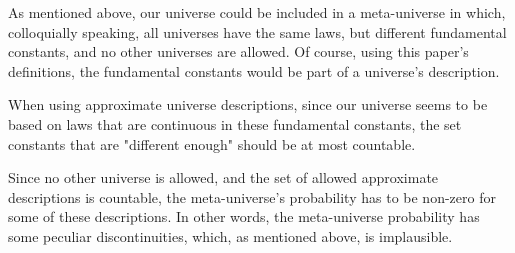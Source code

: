 \documentclass[a4paper
,draft
]{article}
\def\reale{\mathbb{R}}
\newcommand{\ghilimele}[1]{``#1"}
\begin{document}
As mentioned above, our universe could be included in a meta-universe in which,
colloquially speaking, all universes have the same laws,
but different fundamental constants, and no other universes are allowed.
Of course, using this paper's definitions,
the fundamental constants would be part of a universe's description.

When using approximate universe descriptions, since our universe
seems to be based on laws that are continuous in these fundamental constants,
the set constants that are "different enough" should be at most countable.

Since no other universe is allowed, and the set of allowed approximate
descriptions is countable, the meta-universe's probability
has to be non-zero for some of these descriptions. In other words, the
meta-universe probability has some peculiar discontinuities, which, as
mentioned above, is implausible.





\end{document}
